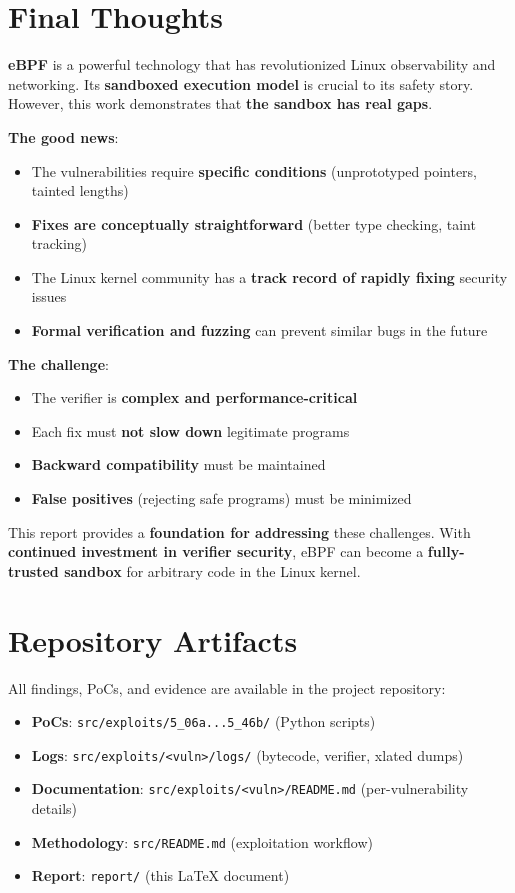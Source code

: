 \section{Final Thoughts}

\noindent
\textbf{eBPF} is a powerful technology that has revolutionized Linux observability and networking. Its \textbf{sandboxed execution model} is crucial to its safety story. However, this work demonstrates that \textbf{the sandbox has real gaps}.

\textbf{The good news}:
\begin{itemize}
  \item The vulnerabilities require \textbf{specific conditions} (unprototyped pointers, tainted lengths)
  \item \textbf{Fixes are conceptually straightforward} (better type checking, taint tracking)
  \item The Linux kernel community has a \textbf{track record of rapidly fixing} security issues
  \item \textbf{Formal verification and fuzzing} can prevent similar bugs in the future
\end{itemize}

\textbf{The challenge}:
\begin{itemize}
  \item The verifier is \textbf{complex and performance-critical}
  \item Each fix must \textbf{not slow down} legitimate programs
  \item \textbf{Backward compatibility} must be maintained
  \item \textbf{False positives} (rejecting safe programs) must be minimized
\end{itemize}

This report provides a \textbf{foundation for addressing} these challenges. With \textbf{continued investment in verifier security}, eBPF can become a \textbf{fully-trusted sandbox} for arbitrary code in the Linux kernel.

\section{Repository Artifacts}

\noindent
All findings, PoCs, and evidence are available in the project repository:

\begin{itemize}
  \item \textbf{PoCs}: \texttt{src/exploits/5\_06a...5\_46b/} (Python scripts)
  \item \textbf{Logs}: \texttt{src/exploits/<vuln>/logs/} (bytecode, verifier, xlated dumps)
  \item \textbf{Documentation}: \texttt{src/exploits/<vuln>/README.md} (per-vulnerability details)
  \item \textbf{Methodology}: \texttt{src/README.md} (exploitation workflow)
  \item \textbf{Report}: \texttt{report/} (this LaTeX document)
\end{itemize}

